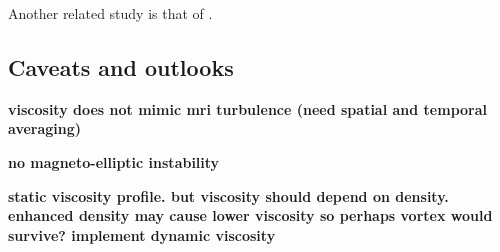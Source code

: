 Another related study is that of \cite{oishi09}. 



\subsection{Caveats and outlooks}\label{caveats}

{\bf viscosity does not mimic mri turbulence (need spatial and
  temporal averaging)}

{\bf no magneto-elliptic instability}

{\bf static viscosity profile. but viscosity should depend on
  density. enhanced density may cause lower viscosity so perhaps vortex would
  survive? implement dynamic viscosity} 

